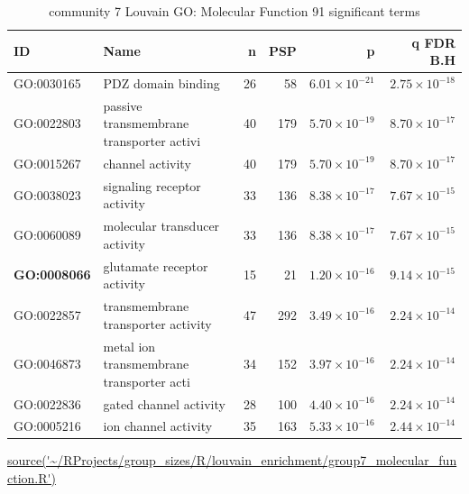 \begin{table}[ht]
\centering
\begin{adjustbox}{width=\textwidth}

\setlength{\extrarowheight}{2pt}
\begin{tabular}{llrrrr}
  \toprule
ID & Name & n & PSP & p & q FDR B.H \\ 
  \midrule
GO:0030165 & PDZ domain binding & 26 & 58 & $6.01 \times 10^{-21}$ & $2.75 \times 10^{-18}$ \\ 
  GO:0022803 & passive transmembrane transporter activi & 40 & 179 & $5.70 \times 10^{-19}$ & $8.70 \times 10^{-17}$ \\ 
  GO:0015267 & channel activity & 40 & 179 & $5.70 \times 10^{-19}$ & $8.70 \times 10^{-17}$ \\ 
  GO:0038023 & signaling receptor activity & 33 & 136 & $8.38 \times 10^{-17}$ & $7.67 \times 10^{-15}$ \\ 
  GO:0060089 & molecular transducer activity & 33 & 136 & $8.38 \times 10^{-17}$ & $7.67 \times 10^{-15}$ \\ 
  \textbf{GO:0008066} & glutamate receptor activity & 15 & 21 & $1.20 \times 10^{-16}$ & $9.14 \times 10^{-15}$ \\ \setlength{\extrarowheight}{2pt}
  GO:0022857 & transmembrane transporter activity & 47 & 292 & $3.49 \times 10^{-16}$ & $2.24 \times 10^{-14}$ \\ 
  GO:0046873 & metal ion transmembrane transporter acti & 34 & 152 & $3.97 \times 10^{-16}$ & $2.24 \times 10^{-14}$ \\ 
  GO:0022836 & gated channel activity & 28 & 100 & $4.40 \times 10^{-16}$ & $2.24 \times 10^{-14}$ \\ 
  GO:0005216 & ion channel activity & 35 & 163 & $5.33 \times 10^{-16}$ & $2.44 \times 10^{-14}$ \\ 
   \bottomrule
\end{tabular}
\end{adjustbox}
\caption{community 7 Louvain GO: Molecular Function 91 significant terms} 
\tiny\url{source('~/RProjects/group_sizes/R/louvain_enrichment/group7_molecular_function.R')}
\label{tab:Group 7 GO: Molecular Function 91 significant terms}
\end{table}


